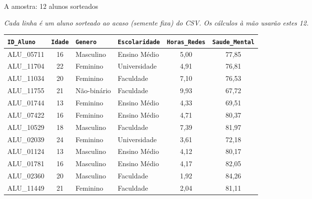 \documentclass[aspectratio=169, 10pt, t]{beamer}
\newcommand{\code}[1]{\texttt{\color{emascindigo}#1}}
\newcommand{\motive}[1]{\par{\small\itshape\color{softgray}#1}\par\vspace{4pt}}
\begin{document}
\begin{frame}{A amostra: 12 alunos sorteados}
\motive{Cada linha é um aluno sorteado ao acaso (semente fixa) do CSV. Os cálculos à mão usarão estes 12.}
\renewcommand{\arraystretch}{0.88}
\centering\footnotesize
\begin{tabular}{lcllcc}
\toprule
\code{ID\_Aluno} & \code{Idade} & \code{Genero} & \code{Escolaridade} & \code{Horas\_Redes} & \code{Saude\_Mental} \\
\midrule
ALU\_05711 & 16 & Masculino & Ensino Médio & 5,00 & 77,85 \\
ALU\_11704 & 22 & Feminino & Universidade & 4,91 & 76,81 \\
ALU\_11034 & 20 & Feminino & Faculdade & 7,10 & 76,53 \\
ALU\_11755 & 21 & Não-binário & Faculdade & 9,93 & 67,72 \\
ALU\_01744 & 13 & Feminino & Ensino Médio & 4,33 & 69,51 \\
ALU\_07422 & 16 & Feminino & Ensino Médio & 4,71 & 80,37 \\
ALU\_10529 & 18 & Masculino & Faculdade & 7,39 & 81,97 \\
ALU\_02039 & 24 & Feminino & Universidade & 3,61 & 72,18 \\
ALU\_01124 & 13 & Masculino & Ensino Médio & 4,12 & 80,17 \\
ALU\_01781 & 16 & Masculino & Ensino Médio & 4,17 & 82,05 \\
ALU\_02360 & 20 & Masculino & Faculdade & 1,92 & 84,26 \\
ALU\_11449 & 21 & Feminino & Faculdade & 2,04 & 81,11 \\
\bottomrule
\end{tabular}
\end{frame}
\end{document}
